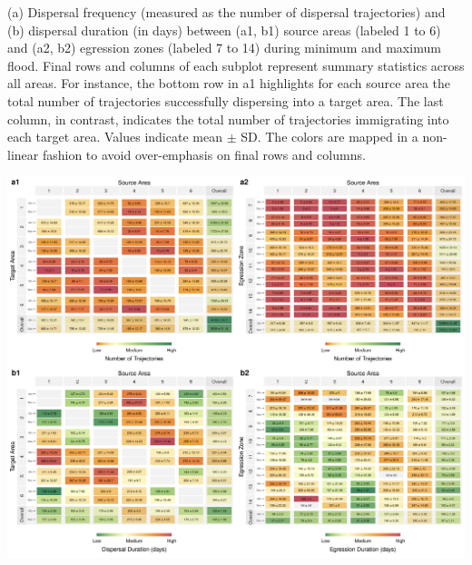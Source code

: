 \documentclass[../FinalThesis.tex]{subfiles}
\begin{document}
\begin{table}
 \caption{(a) Dispersal frequency (measured as the number of dispersal
 trajectories) and (b) dispersal duration (in days) between (a1, b1) source
 areas (labeled 1 to 6) and (a2, b2) egression zones (labeled 7 to 14) during
 minimum and maximum flood. Final rows and columns of each subplot represent
 summary statistics across all areas. For instance, the bottom row in a1
 highlights for each source area the total number of trajectories successfully
 dispersing into a target area. The last column, in contrast, indicates the
 total number of trajectories immigrating into each target area. Values indicate
 mean $\pm$ SD. The colors are mapped in a non-linear fashion to avoid
 over-emphasis on final rows and columns.}
 \label{IPCTable}
 \includegraphics[width = \textwidth]{Figures/InterpatchConnectivityTable2.png}
\end{table}
\end{document}
